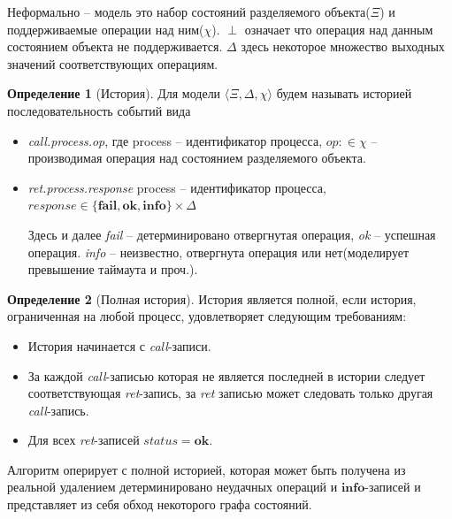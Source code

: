 \documentclass[pdftex,ptm,14pt,a4paper]{extreport}
\theoremstyle{definition}
\newtheorem{definition}{Определение}[chapter]
\begin{document}
Неформально -- модель это набор состояний разделяемого объекта($\Xi$) и поддерживаемые операции над ним($\chi$).
$\perp$ означает что операция над данным состоянием объекта не поддерживается. $\Delta$ здесь некоторое множество
выходных значений соответствующих операциям.

\begin{definition}[История]
    Для модели $\langle \Xi, \Delta, \chi \rangle$ будем называть историей последовательность событий вида
    \begin{itemize}
        \item \textit{call.process.op}, где process --  идентификатор процесса,
             $\textit{op}: \in \chi$  -- производимая операция над состоянием разделяемого объекта.
        \item \textit{ret.process.response} process -- идентификатор процесса,
            $\textit{response} \in  \{\textbf{fail},\textbf{ok},\textbf{info}\} \times \Delta$

            Здесь и далее
        \subitem \textit{fail} -- детерминировано отвергнутая операция,
        \subitem \textit{ok} -- успешная операция.
        \subitem \textit{info} -- неизвестно, отвергнута операция или нет(моделирует превышение таймаута и проч.).
    \end{itemize}
\end{definition}

\begin{definition}[Полная история]
    История является полной, если история, ограниченная на любой процесс, удовлетворяет следующим требованиям:
    \begin{itemize}
        \item История начинается с \textit{call}-записи.
        \item За каждой \textit{call}-записью которая не является последней в истории
            следует соответствующая \textit{ret}-запись,
            за \textit{ret} записью может следовать только другая \textit{call}-запись.
        \item Для всех \textit{ret}-записей $\textit{status} = \textbf{ok}.$
    \end{itemize}
\end{definition}

Алгоритм оперирует с полной историей, которая может быть получена из реальной удалением
детерминировано неудачных операций и $\textbf{info}$-записей и представляет из себя обход некоторого графа состояний.
\end{document}
